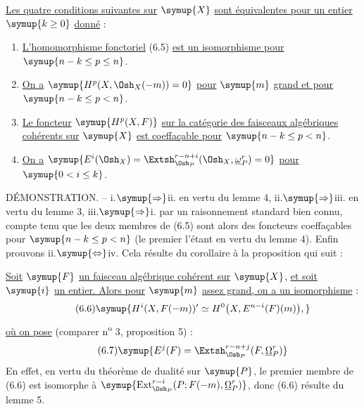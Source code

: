  \uline{Les quatre conditions suivantes sur} $\symup{X}$ \uline{sont
équivalentes pour un entier} $\symup{k\geq0}$ \uline{donné} :
\begin{enumerate}
  \item[\textnormal{i.}] \uline{L'homomorphisme fonctoriel} (6.5) \uline{est un isomorphisme pour}
    $\symup{n-k\leq p\leq n}$.
  \item[\textnormal{ii.}] \uline{On a} $\symup{H^{p}(X,\Osh_X(-m))=0}$ \uline{pour} $\symup{m}$ \uline{grand et pour}
    $\symup{n-k\leq p<n}$.
  \item[\textnormal{iii.}] \uline{Le foncteur} $\symup{H^{p}(X,F)}$ \uline{sur la catégorie des faisceaux
    algébriques cohérents sur} $\symup{X}$ \uline{est coeffaçable pour} $\symup{n-k\leq p<n}$.
  \item[\textnormal{iv.}] \uline{On a}
    $\symup{E^{i}(\Osh_X)=\Extsh_{\Osh_P}^{r-n+i}(\Osh_X,\underline{\omega}_P^{r})=0}$
    \uline{pour} $\symup{0<i\leq k}$.
\end{enumerate}

\noindent DÉMONSTRATION. -- \textnormal{i.}$\symup{\Rightarrow}$\textnormal{ii.} en
vertu du lemme 4, \textnormal{ii.}$\symup{\Rightarrow}$\textnormal{iii.} en vertu du lemme 3,
\textnormal{iii.}$\symup{\Rightarrow}$\textnormal{i.} par un raisonnement standard bien connu,
compte tenu que les deux membres de (6.5) sont alors des foncteurs coeffaçables
pour $\symup{n-k\leq p<n}$ (le premier l'étant en vertu du lemme 4). Enfin prouvons
\textnormal{ii.}$\symup{\Leftrightarrow}$\textnormal{iv.} Cela résulte du corollaire à la
proposition qui suit :

 \uline{Soit} $\symup{F}$ \uline{un faisceau algébrique cohérent sur} $\symup{X}$, \uline{et
soit} $\symup{i}$ \uline{un entier. Alors pour} $\symup{m}$ \uline{assez grand, on a un isomorphisme} :
\begin{equation}\tag{6.6}
  \symup{H^{i}(X,F(-m))'
  \simeq H^{0}\bigl(X,E^{n-i}(F)(m)\bigr),}
\end{equation}
\uline{où on pose} (comparer n\textsuperscript{o} 3, proposition 5) :
\begin{equation}\tag{6.7}
  \symup{E^{j}(F)=\Extsh_{\Osh_P}^{r-n+j}(F,\underline{\Omega}_P^{r})}
\end{equation}
En effet, en vertu du théorème de dualité sur $\symup{P}$, le premier membre de (6.6)
est isomorphe à
$\symup{\operatorname{Ext}_{\Osh_P}^{r-i}(P;F(-m),\underline{\Omega}_P^{r})}$, donc (6.6) résulte
du lemme 5.

